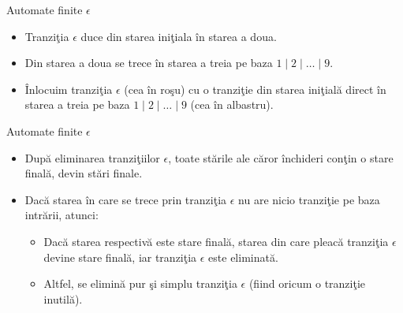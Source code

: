 \documentclass[pdf]{beamer}
\begin{document}
\begin{frame}{Automate finite $\epsilon$}
\begin{itemize}
\item Tranziţia $\epsilon$ duce din starea iniţiala în starea a doua.
\item Din starea a doua se trece în starea a treia pe baza $1\mid2\mid\dots\mid9$.
\item Înlocuim tranziţia $\epsilon$ (cea în roşu) cu o tranziţie din starea iniţială direct în starea a treia pe baza $1\mid2\mid\dots\mid9$ (cea în albastru).
\end{itemize}

\begin{figure}[H]
\centering
{}
\end{figure}
\end{frame}



\begin{frame}{Automate finite $\epsilon$}
\begin{itemize}
\item
După eliminarea tranziţiilor $\epsilon$, toate stările ale căror închideri conţin o stare finală, devin stări finale.
\item
Dacă starea în care se trece prin tranziţia $\epsilon$ nu are nicio tranziţie pe baza intrării, atunci:
\begin{itemize}
	\item
	Dacă starea respectivă este stare finală, starea din care pleacă tranziţia $\epsilon$ devine stare finală, iar tranziţia $\epsilon$ este eliminată.
	\item
	Altfel, se elimină pur şi simplu tranziţia $\epsilon$ (fiind oricum o tranziţie inutilă).
\end{itemize}
\end{itemize}
\end{frame}
\end{document}
